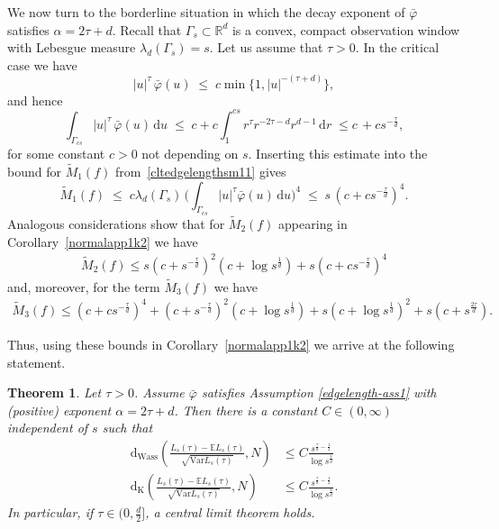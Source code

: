 \documentclass{article}
\newtheorem{theorem}{Theorem}[section]
\theoremstyle{definition}
\numberwithin{equation}{section}
\theoremstyle{remark}
\newcommand{\E}{\mathbb{E}}
\newcommand{\Var}{\mathrm{Var}}
\begin{document}
We now turn to the borderline situation in which the decay exponent of $\bar{\varphi}$ satisfies
$\alpha = 2\tau + d$. Recall that $\Gamma_s \subset \mathbb{R}^d$ is a convex, compact observation
window with Lebesgue measure $\lambda_d(\Gamma_s)=s$. Let us assume that $\tau >0$. In the critical case we have
\[
|u|^{\tau}\,\bar{\varphi}(u) \;\leq \; c\min\{ 1,|u|^{-(\tau + d)}\}, 
\]
and hence
\[
\int_{\Gamma_{cs}} |u|^{\tau}\,\bar{\varphi}(u)\,\mathrm{d}u
\;\leq\;
c+c\int_1^{{cs}} r^{\tau}r^{-2\tau - d}r^{d-1}\,\mathrm{d}r
\; \leq c\, + cs^{-\frac{\tau}{d}},
\]
for some constant $c>0$ not depending on $s$. Inserting this estimate into the bound for $\widetilde{M}_1(f)$ from~\eqref{cltedgelengthsm11} gives
\[
\widetilde{M}_1(f)
\;\leq\;
 c \lambda_d(\Gamma_s)\,\Big(\int_{\Gamma_{cs}} |u|^{\tau}\bar{\varphi}(u)\,\mathrm{d}u\Big)^{4}
\;\leq\;
s\,(c+cs^{-\frac{\tau}{d}})^4.
\]
Analogous considerations show that for $\widetilde{M}_2(f)$ appearing in
Corollary~\ref{normalapp1k2} we have
\begin{align*}
   \widetilde{M}_2(f)\leq s (c +s^{-\frac{\tau}{d}})^2(c + \log s^{\frac{1}{d}}) + s(c+cs^{-\frac{\tau}{d}})^4
\end{align*}
and, moreover, for the term $\widetilde{M}_3(f)$ we have
\begin{align*}
    \widetilde{M}_3(f) \leq  (c+cs^{-\frac{\tau}{d}})^4 + (c +s^{-\frac{\tau}{d}})^2(c + \log s^{\frac{1}{d}}) + s(c + \log s^{\frac{1}{d}})^2 +s(c +s^{\frac{2\tau}{d}}).
\end{align*}

Thus, using these bounds in Corollary~\ref{normalapp1k2} we arrive at the following statement.

\begin{theorem} \label{CLT:sumsedgelengthscritical}
    Let $\tau > 0$. Assume $\bar{\varphi}$ satisfies Assumption \ref{edgelength-ass1} with (positive) exponent $\alpha = 2\tau + d$. Then there is a constant $C \in (0, \infty)$ independent of $s$ such that
    \begin{align*}
	\mathrm{d}_{\mathrm{Wass}}\left(\frac{L_s(\tau)-\E L_s(\tau)}{\sqrt{\Var L_s(\tau)}},N\right) & \le C \frac{s^{\frac{\tau}{d}-\frac12}}{\log s^{\frac{1}{d}}}\\
	\mathrm{d}_{\mathrm{K}}\left(\frac{L_s(\tau)-\E L_s(\tau)}{\sqrt{\Var L_s(\tau)}},N\right) & \le  C \frac{s^{\frac{\tau}{d}-\frac12}}{\log s^{\frac{1}{d}}}.
\end{align*}
In particular, if $\tau \in (0, \frac{d}{2}]$, a central limit theorem holds.
\end{theorem}
\end{document}
